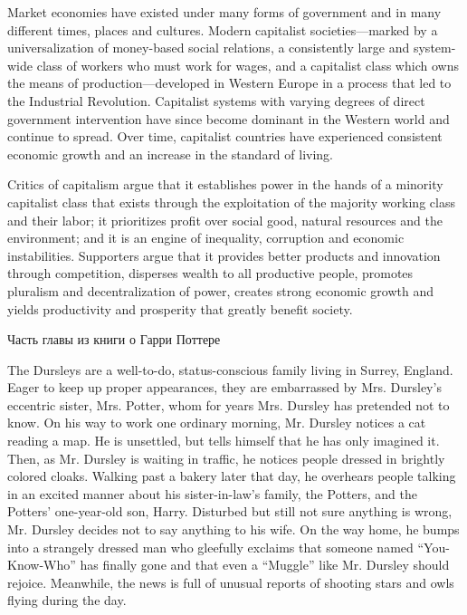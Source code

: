 Market economies have existed under many forms of government and in many different times, places and cultures. Modern capitalist societies—marked by a universalization of money-based social relations, a consistently large and system-wide class of workers who must work for wages, and a capitalist class which owns the means of production—developed in Western Europe in a process that led to the Industrial Revolution. Capitalist systems with varying degrees of direct government intervention have since become dominant in the Western world and continue to spread. Over time, capitalist countries have experienced consistent economic growth and an increase in the standard of living.

Critics of capitalism argue that it establishes power in the hands of a minority capitalist class that exists through the exploitation of the majority working class and their labor; it prioritizes profit over social good, natural resources and the environment; and it is an engine of inequality, corruption and economic instabilities. Supporters argue that it provides better products and innovation through competition, disperses wealth to all productive people, promotes pluralism and decentralization of power, creates strong economic growth and yields productivity and prosperity that greatly benefit society.

\newpage

\begin{flushright}
{} 
\end{flushright}
\begin{center}
Часть главы из книги о Гарри Поттере
\end{center}

The Dursleys are a well-to-do, status-conscious family living in Surrey, England. Eager to keep up proper appearances, they are embarrassed by Mrs. Dursley’s eccentric sister, Mrs. Potter, whom for years Mrs. Dursley has pretended not to know. On his way to work one ordinary morning, Mr. Dursley notices a cat reading a map. He is unsettled, but tells himself that he has only imagined it. Then, as Mr. Dursley is waiting in traffic, he notices people dressed in brightly colored cloaks. Walking past a bakery later that day, he overhears people talking in an excited manner about his sister-in-law’s family, the Potters, and the Potters’ one-year-old son, Harry. Disturbed but still not sure anything is wrong, Mr. Dursley decides not to say anything to his wife. On the way home, he bumps into a strangely dressed man who gleefully exclaims that someone named “You-Know-Who” has finally gone and that even a “Muggle” like Mr. Dursley should rejoice. Meanwhile, the news is full of unusual reports of shooting stars and owls flying during the day.

